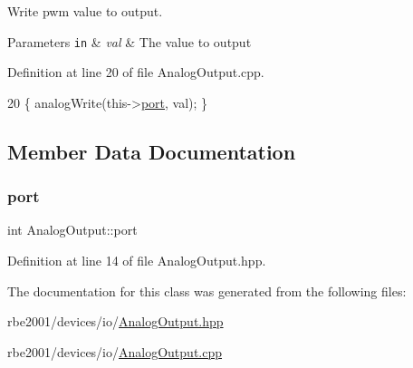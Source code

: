 Write pwm value to output. 


\begin{DoxyParams}[1]{Parameters}
\mbox{\tt in}  & {\em val} & The value to output \\
\hline
\end{DoxyParams}


Definition at line 20 of file Analog\+Output.\+cpp.


\begin{DoxyCode}
20 \{ analogWrite(this->\hyperlink{class_analog_output_a52a084ec21b0e7f4cf9eb29af2fd103c}{port}, val); \}
\end{DoxyCode}


\subsection{Member Data Documentation}
\mbox{\label{class_analog_output_a52a084ec21b0e7f4cf9eb29af2fd103c}} 
\subsubsection{\texorpdfstring{port}{port}}
{\footnotesize\ttfamily int Analog\+Output\+::port\hspace{0.3cm}{\ttfamily [private]}}



Definition at line 14 of file Analog\+Output.\+hpp.



The documentation for this class was generated from the following files\+:\begin{DoxyCompactItemize}
\item 
rbe2001/devices/io/\hyperlink{_analog_output_8hpp}{Analog\+Output.\+hpp}\item 
rbe2001/devices/io/\hyperlink{_analog_output_8cpp}{Analog\+Output.\+cpp}\end{DoxyCompactItemize}
